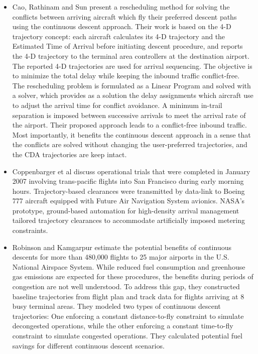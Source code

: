 \documentclass{aer1315-pretty}
\begin{document}
\begin{itemize}
\item Cao, Rathinam and Sun \cite{Cao:2011} present a rescheduling method for solving the conflicts between arriving aircraft which fly their preferred descent paths using the continuous descent approach. Their work is based on the 4-D trajectory concept: each aircraft calculates its 4-D trajectory and the Estimated Time of Arrival before initiating descent procedure, and reports the 4-D trajectory to the terminal area controllers at the destination airport. The reported 4-D trajectories are used for arrival sequencing. The objective is to minimize the total delay while keeping the inbound traffic conflict-free. The rescheduling problem is formulated as a Linear Program and solved with a solver, which provides as a solution the delay assignments which aircraft use to adjust the arrival time for conflict avoidance. A minimum in-trail separation is imposed between successive arrivals to meet the arrival rate of the airport. Their proposed approach leads to a conflict-free inbound traffic. Most importantly, it benefits the continuous descent approach in a sense that the conflicts are solved without changing the user-preferred trajectories, and the CDA trajectories are keep intact. 


\item Coppenbarger et al \cite{Copp:2007} discuss operational trials that were completed in January 2007 involving trans-pacific flights into San Francisco during early morning hours. Trajectory-based clearances were transmitted by data-link to Boeing 777 aircraft equipped with Future Air Navigation System avionics. NASA’s prototype, ground-based automation for high-density arrival management tailored trajectory clearances to accommodate artificially imposed metering constraints. 

\item Robinson and Kamgarpur \cite{Rob:2010} estimate the potential benefits of continuous descents for more than 480,000 flights to 25 major airports in the U.S. National Airspace System. While reduced fuel consumption and greenhouse gas emissions are expected for these procedures, the benefits during periods of congestion are not well understood. To address this gap, they constructed baseline trajectories  from flight plan and track data for flights arriving at 8 busy terminal areas. They modeled two types of continuous descent trajectories: One enforcing a constant distance-to-fly constraint to simulate decongested operations, while the other enforcing a constant time-to-fly constraint to simulate congested operations. They calculated potential fuel savings for different continuous descent scenarios. 


\end{itemize}
\end{document}
